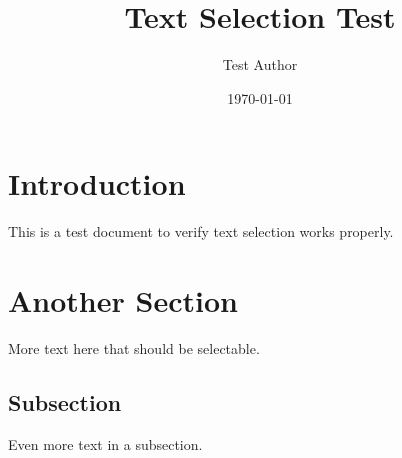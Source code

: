 \documentclass{article}
\begin{document}
\title{Text Selection Test}
\author{Test Author}
\date{\today}
\maketitle

\section{Introduction}
This is a test document to verify text selection works properly.

\lipsum[1-3]

\section{Another Section}
More text here that should be selectable.

\lipsum[4-5]

\subsection{Subsection}
Even more text in a subsection.
\end{document}
